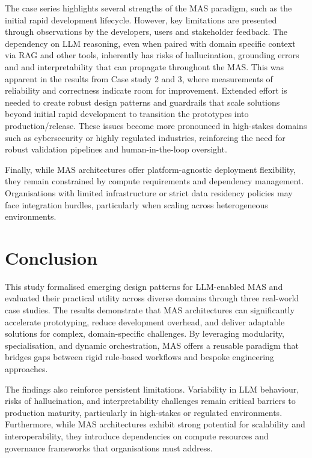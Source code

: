 \documentclass{article}
\begin{document}
The case series highlights several strengths of the MAS paradigm, such as the initial rapid development lifecycle. However, key limitations are presented through observations by the developers, users and stakeholder feedback. The dependency on LLM reasoning, even when paired with domain specific context via RAG and other tools, inherently has risks of hallucination, grounding errors and and interpretability that can propagate throughout the MAS. This was apparent in the results from Case study 2 and 3, where measurements of reliability and correctness indicate room for improvement. Extended effort is needed to create robust design patterns and guardrails that scale solutions beyond initial rapid development to transition the prototypes into production/release. These issues become more pronounced in high-stakes domains such as cybersecurity or highly regulated industries, reinforcing the need for robust validation pipelines and human-in-the-loop oversight.

Finally, while MAS architectures offer platform-agnostic deployment flexibility, they remain constrained by compute requirements and dependency management. Organisations with limited infrastructure or strict data residency policies may face integration hurdles, particularly when scaling across heterogeneous environments.

\section{Conclusion} \label{sec:conclusion}

This study formalised emerging design patterns for LLM-enabled MAS and evaluated their practical utility across diverse domains through three real-world case studies. The results demonstrate that MAS architectures can significantly accelerate prototyping, reduce development overhead, and deliver adaptable solutions for complex, domain-specific challenges. By leveraging modularity, specialisation, and dynamic orchestration, MAS offers a reusable paradigm that bridges gaps between rigid rule-based workflows and bespoke engineering approaches.

The findings also reinforce persistent limitations. Variability in LLM behaviour, risks of hallucination, and interpretability challenges remain critical barriers to production maturity, particularly in high-stakes or regulated environments. Furthermore, while MAS architectures exhibit strong potential for scalability and interoperability, they introduce dependencies on compute resources and governance frameworks that organisations must address.
\end{document}
